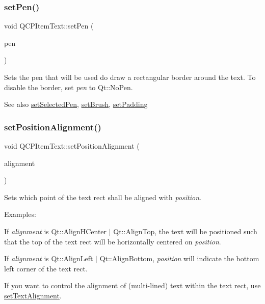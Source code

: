 \subsubsection{\texorpdfstring{set\+Pen()}{setPen()}}
{\footnotesize\ttfamily void Q\+C\+P\+Item\+Text\+::set\+Pen (\begin{DoxyParamCaption}\item[{const Q\+Pen \&}]{pen }\end{DoxyParamCaption})}

Sets the pen that will be used do draw a rectangular border around the text. To disable the border, set {\itshape pen} to Qt\+::\+No\+Pen.

\begin{DoxySeeAlso}{See also}
\hyperlink{class_q_c_p_item_text_a291febe586f0da3f1c392e77bef4aa20}{set\+Selected\+Pen}, \hyperlink{class_q_c_p_item_text_a1c7e131516df2ed8d941ef31240ded8e}{set\+Brush}, \hyperlink{class_q_c_p_item_text_aeea8a3e01f135f9dd0bb08f51db66310}{set\+Padding} 
\end{DoxySeeAlso}
\mbox{\label{class_q_c_p_item_text_a781cdf8c640fc6a055dcff1e675c8c7a}} 
\subsubsection{\texorpdfstring{set\+Position\+Alignment()}{setPositionAlignment()}}
{\footnotesize\ttfamily void Q\+C\+P\+Item\+Text\+::set\+Position\+Alignment (\begin{DoxyParamCaption}\item[{Qt\+::\+Alignment}]{alignment }\end{DoxyParamCaption})}

Sets which point of the text rect shall be aligned with {\itshape position}.

Examples\+: \begin{DoxyItemize}
\item If {\itshape alignment} is {\ttfamily Qt\+::\+Align\+H\+Center $\vert$ Qt\+::\+Align\+Top}, the text will be positioned such that the top of the text rect will be horizontally centered on {\itshape position}. \item If {\itshape alignment} is {\ttfamily Qt\+::\+Align\+Left $\vert$ Qt\+::\+Align\+Bottom}, {\itshape position} will indicate the bottom left corner of the text rect.\end{DoxyItemize}
If you want to control the alignment of (multi-\/lined) text within the text rect, use \hyperlink{class_q_c_p_item_text_ab5bc0684c4d1bed81949a11b34dba478}{set\+Text\+Alignment}. \mbox{\label{class_q_c_p_item_text_a4bcc10cd97952c3f749d75824b5077f0}} 
